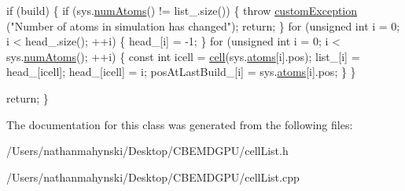 \begin{DoxyCode}
    \textcolor{keywordflow}{if} (build) \{
        \textcolor{keywordflow}{if} (sys.\hyperlink{classsystem_definition_ae8d3c2df2d56241cee03fcc4e2026ae0}{numAtoms}() != list\_.size()) \{
            \textcolor{keywordflow}{throw} \hyperlink{classcustom_exception}{customException} (\textcolor{stringliteral}{"Number of atoms in
       simulation has changed"});
            \textcolor{keywordflow}{return};
        \}
        \textcolor{keywordflow}{for} (\textcolor{keywordtype}{unsigned} \textcolor{keywordtype}{int} i = 0; i < head\_.size(); ++i) \{
            head\_[i] = -1;
        \}
            \textcolor{keywordflow}{for} (\textcolor{keywordtype}{unsigned} \textcolor{keywordtype}{int} i = 0; i < sys.\hyperlink{classsystem_definition_ae8d3c2df2d56241cee03fcc4e2026ae0}{numAtoms}(); ++i) \{
                \textcolor{keyword}{const} \textcolor{keywordtype}{int} icell = \hyperlink{classcell_list__cpu_a564d95c9bd7af0829291789d173361e0}{cell}(sys.\hyperlink{classsystem_definition_ae8814d3f60fc1111af2a3f218a4bfcab}{atoms}[i].pos);
                list\_[i] = head\_[icell];
                head\_[icell] = i;
                posAtLastBuild\_[i] = sys.\hyperlink{classsystem_definition_ae8814d3f60fc1111af2a3f218a4bfcab}{atoms}[i].pos;
            \}
    \} 

    \textcolor{keywordflow}{return};
\}
\end{DoxyCode}


The documentation for this class was generated from the following files\-:\begin{DoxyCompactItemize}
\item 
/\-Users/nathanmahynski/\-Desktop/\-C\-B\-E\-M\-D\-G\-P\-U/cell\-List.\-h\item 
/\-Users/nathanmahynski/\-Desktop/\-C\-B\-E\-M\-D\-G\-P\-U/cell\-List.\-cpp\end{DoxyCompactItemize}
